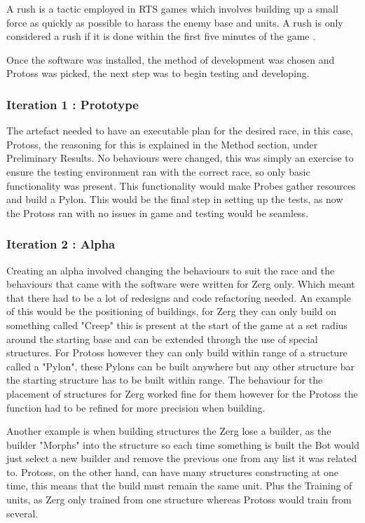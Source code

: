 \documentclass[journal]{IEEEtran}
\begin{document}
	A rush is a tactic employed in RTS games which involves building up a small force as quickly as possible to harass the enemy base and units. A rush is only considered a rush if it is done within the first five minutes of the game \cite{Liqui}.
	
	Once the software was installed, the method of development was chosen and Protoss was picked, the next step was to begin testing and developing. 
	\newline
	
	\subsubsection{Iteration 1 : Prototype}
	The artefact needed to have an executable plan for the desired race, in this case, Protoss, the reasoning for this is explained in the Method section, under Preliminary Results. No behaviours were changed, this was simply an exercise to ensure the testing environment ran with the correct race, so only basic functionality was present. This functionality would make Probes gather resources and build a Pylon. This would be the final step in setting up the tests, as now the Protoss ran with no issues in game and testing would be seamless.
	\newline
	
	\subsubsection{Iteration 2 : Alpha}
	Creating an alpha involved changing the behaviours to suit the race and the behaviours that came with the software were written for Zerg only. Which meant that there had to be a lot of redesigns and code refactoring needed. An example of this would be the positioning of buildings, for Zerg they can only build on something called "Creep" this is present at the start of the game at a set radius around the starting base and can be extended through the use of special structures. For Protoss however they can only build within range of a structure called a "Pylon", these Pylons can be built anywhere but any other structure bar the starting structure has to be built within range. The behaviour for the placement of structures for Zerg worked fine for them however for the Protoss the function had to be refined for more precision when building. 
	
	Another example is when building structures the Zerg lose a builder, as the builder "Morphs" into the structure so each time something is built the Bot would just select a new builder and remove the previous one from any list it was related to. Protoss, on the other hand, can have many structures constructing at one time, this means that the build must remain the same unit. Plus the Training of units, as Zerg only trained from one structure whereas Protoss would train from several.
	
\end{document}
